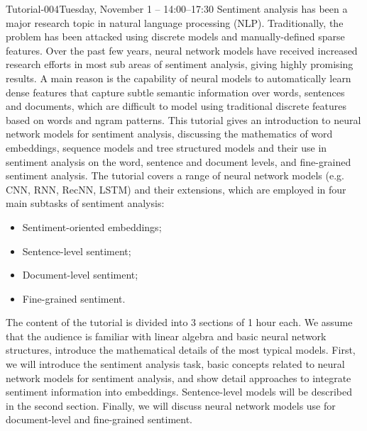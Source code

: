 \begin{tutorial}{Tutorial-004}{Tuesday, November 1 -- 14:00--17:30}{\TutLocD}
 Sentiment analysis has been a major research topic in natural language processing (NLP). Traditionally, the problem has been attacked using discrete models and manually-defined sparse features. Over the past few years, neural network models have received increased research efforts in most sub areas of sentiment analysis, giving highly promising results. A main reason is the capability of neural models to automatically learn dense features that capture subtle semantic information over words, sentences and documents, which are difficult to model using traditional discrete features based on words and ngram patterns. This tutorial gives an introduction to neural network models for sentiment analysis, discussing the mathematics of word embeddings, sequence models and tree structured models and their use in sentiment analysis on the word, sentence and document levels, and fine-grained sentiment analysis. The tutorial covers a range of neural network models (e.g. CNN, RNN, RecNN, LSTM) and their extensions, which are employed in four main subtasks of sentiment analysis:
\begin{itemize}
\item     Sentiment-oriented embeddings;
\item      Sentence-level sentiment;
\item      Document-level sentiment;
\item      Fine-grained sentiment. 
\end{itemize}
The content of the tutorial is divided into 3 sections of 1 hour each. We assume that the audience is familiar with linear algebra and basic neural network structures, introduce the mathematical details of the most typical models. First, we will introduce the sentiment analysis task, basic concepts related to neural network models for sentiment analysis, and show detail approaches to integrate sentiment information into embeddings. Sentence-level models will be described in the second section. Finally, we will discuss neural network models use for document-level and fine-grained sentiment. 
\end{tutorial} 

\clearpage{}









